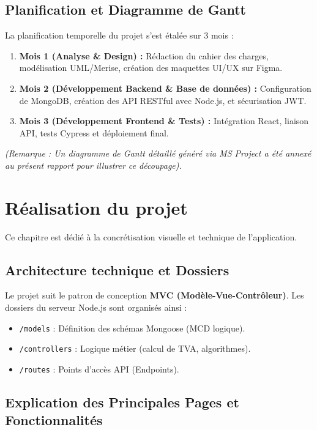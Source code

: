 \documentclass[12pt, a4paper]{report}
\begin{document}
\section{Planification et Diagramme de Gantt}
La planification temporelle du projet s'est étalée sur 3 mois :
\begin{enumerate}
    \item \textbf{Mois 1 (Analyse \& Design) :} Rédaction du cahier des charges, modélisation UML/Merise, création des maquettes UI/UX sur Figma.
    \item \textbf{Mois 2 (Développement Backend \& Base de données) :} Configuration de MongoDB, création des API RESTful avec Node.js, et sécurisation JWT.
    \item \textbf{Mois 3 (Développement Frontend \& Tests) :} Intégration React, liaison API, tests Cypress et déploiement final.
\end{enumerate}
\textit{(Remarque : Un diagramme de Gantt détaillé généré via MS Project a été annexé au présent rapport pour illustrer ce découpage).}

\chapter{Réalisation du projet}

Ce chapitre est dédié à la concrétisation visuelle et technique de l'application.

\section{Architecture technique et Dossiers}
Le projet suit le patron de conception \textbf{MVC (Modèle-Vue-Contrôleur)}. Les dossiers du serveur Node.js sont organisés ainsi :
\begin{itemize}
    \item \texttt{/models} : Définition des schémas Mongoose (MCD logique).
    \item \texttt{/controllers} : Logique métier (calcul de TVA, algorithmes).
    \item \texttt{/routes} : Points d'accès API (Endpoints).
\end{itemize}

\section{Explication des Principales Pages et Fonctionnalités}
\end{document}
